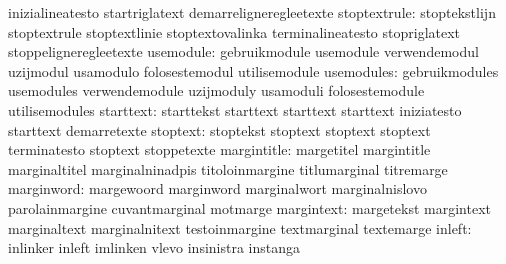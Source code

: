                                   inizialineatesto                 startriglatext
                                  demarreligneregleetexte
                    stoptextrule: stoptekstlijn                    stoptextrule
                                  stoptextlinie                    stoptextovalinka
                                  terminalineatesto                stopriglatext
                                  stoppeligneregleetexte
                       usemodule: gebruikmodule                    usemodule
                                  verwendemodul                    uzijmodul
                                  usamodulo                        folosestemodul
                                  utilisemodule
                      usemodules: gebruikmodules                   usemodules
                                  verwendemodule                   uzijmoduly
                                  usamoduli                        folosestemodule
                                  utilisemodules
                       starttext: starttekst                       starttext
                                  starttext                        starttext
                                  iniziatesto                      starttext
                                  demarretexte
                        stoptext: stoptekst                        stoptext
                                  stoptext                         stoptext
                                  terminatesto                     stoptext
                                  stoppetexte
                     margintitle: margetitel                       margintitle
                                  marginaltitel                    marginalninadpis
                                  titoloinmargine                  titlumarginal
                                  titremarge
                      marginword: margewoord                       marginword
                                  marginalwort                     marginalnislovo
                                  parolainmargine                  cuvantmarginal
                                  motmarge
                      margintext: margetekst                       margintext
                                  marginaltext                     marginalnitext
                                  testoinmargine                   textmarginal
                                  textemarge
                          inleft: inlinker                         inleft
                                  imlinken                         vlevo
                                  insinistra                       instanga
